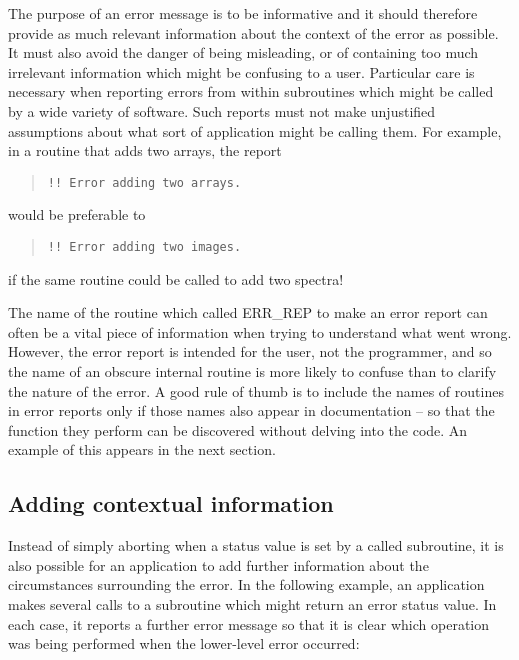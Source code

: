 The purpose of an error message is to be informative and it should
therefore provide as much relevant information about the context of the
error as possible.
It must also avoid the danger of being misleading, or of containing
too much irrelevant information which might be confusing to a user. 
Particular care is necessary when reporting errors from within subroutines
which might be called by a wide variety of software.
Such reports must not make unjustified assumptions about what sort of 
application might be calling them.
For example, in a routine that adds two arrays, the report

\begin {quote}
\begin {small}
\begin{verbatim}
!! Error adding two arrays.
\end{verbatim}
\end {small}
\end {quote}

would be preferable to

\begin {quote}
\begin {small}
\begin{verbatim}
!! Error adding two images.
\end{verbatim}
\end {small}
\end {quote}

if the same routine could be called to add two spectra!

The name of the routine which called ERR\_REP to make an error report can
often be a vital piece of information when trying to understand what went
wrong. 
However, the error report is intended for the user, not the programmer, and so
the name of an obscure internal routine is more likely to confuse than to
clarify the nature of the error.
A good rule of thumb is to include the names of routines in error reports
only if those names also appear in documentation -- so that the function
they perform can be discovered without delving into the code.
An example of this appears in the next section.


\subsection {Adding contextual information}

Instead of simply aborting when a status value is set by a called
subroutine, it is also possible for an application to add further information
about the circumstances surrounding the error. 
In the following example, an application makes several calls to a subroutine
which might return an error status value. 
In each case, it reports a further error message so that it is clear which 
operation was being performed when the lower-level error occurred:

